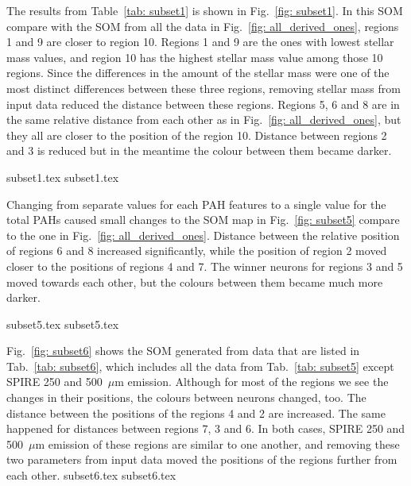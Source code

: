             The results from Table~\ref{tab: subset1} is shown in Fig.~\ref{fig: subset1}. 
            In this SOM compare with the SOM from all the data in Fig.~\ref{fig: all_derived_ones}, regions 1 and 9 are closer to region 10. 
            Regions 1 and 9 are the ones with lowest stellar mass values, and region 10 has the highest stellar mass value among those 10 regions. 
            Since the differences in the amount of the stellar mass were one of the most distinct differences between these three regions, removing stellar mass from input data reduced the distance between these regions.
            Regions 5, 6 and 8 are in the same relative distance from each other as in Fig.~\ref{fig: all_derived_ones}, but they all are closer to the position of the region 10.
            Distance between regions 2 and 3 is reduced but in the meantime the colour between them became darker.

            {subset1.tex}
            {subset1.tex}

            Changing from separate values for each PAH features to a single value for the total PAHs caused small changes to the SOM map in Fig.~\ref{fig: subset5} compare to the one in Fig.~\ref{fig: all_derived_ones}. 
            Distance between the relative position of regions 6 and 8 increased significantly, while the position of region 2 moved closer to the positions of regions 4 and 7.
            The winner neurons for regions 3 and 5 moved towards each other, but the colours between them became much more darker. 

            {subset5.tex}
            {subset5.tex}

            Fig.~\ref{fig: subset6} shows the SOM generated from data that are listed in Tab.~\ref{tab: subset6}, which includes all the data from Tab.~\ref{tab: subset5} except SPIRE 250 and 500~$\mu$m emission.
            Although for most of the regions we see the changes in their positions, the colours between neurons changed, too. 
            The distance between the positions of the regions 4 and 2 are increased.
            The same happened for distances between regions 7, 3 and 6.
            In both cases, SPIRE 250 and 500~$\mu$m emission of these regions are similar to one another, and removing these two parameters from input data moved the positions of the regions further from each other. 
            {subset6.tex}
            {subset6.tex}
            
